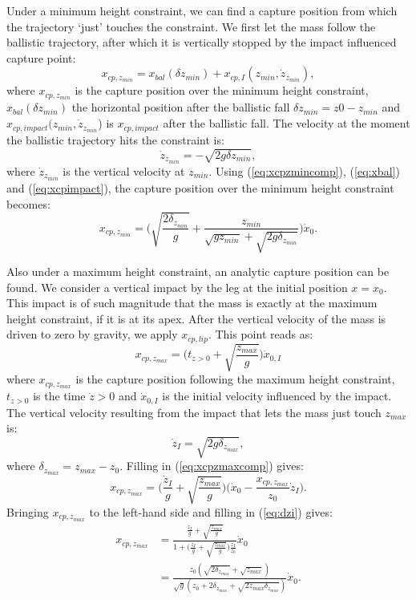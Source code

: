 \documentclass[letterpaper, 10 pt, conference]{ieeeconf}  %
\newcommand{\zmin}{z_{min}}
\newcommand{\zmax}{z_{max}}
\begin{document}
Under a minimum height constraint, we can find a capture position from which the trajectory `just' touches the constraint. We first let the mass follow the ballistic trajectory, after which it is vertically stopped by the impact influenced capture point:
\begin{equation}
	x_{cp,\zmin} = x_{bal}(\delta \zmin) + x_{cp,I}(\zmin, \dot{z}_{\zmin}),
	\label{eq:xcpzmincomp}
\end{equation}
where $x_{cp,\zmin}$ is the capture position over the minimum height constraint, $x_{bal}(\delta \zmin)$ the horizontal position after the ballistic fall $\delta \zmin = z0-\zmin$ and $x_{cp,impact}(\zmin,\dot{z}_{\zmin}$) is $x_{cp,impact}$ after the ballistic fall. The velocity at the moment the ballistic trajectory hits the constraint is:
\begin{equation}
	\dot{z}_{\zmin} = -\sqrt{2g\delta \zmin},
\end{equation}
where $\dot{z}_{\zmin}$ is the vertical velocity at $z_{min}$. Using (\ref{eq:xcpzmincomp}), (\ref{eq:xbal}) and (\ref{eq:xcpimpact}), the capture position over the minimum height constraint becomes:
\begin{equation}
	x_{cp,\zmin} = \Bigg(\sqrt{\frac{2\delta_{z_{min}}}{g}} + \frac{\zmin}{\sqrt{g \zmin}+\sqrt{2g\delta_{\zmin}}}\Bigg)\dot{x}_0.
\end{equation}

Also under a maximum height constraint, an analytic capture position can be found. We consider a vertical impact by the leg at the initial position $x=x_0$. This impact is of such magnitude that the mass is exactly at the maximum height constraint, if it is at its apex. After the vertical velocity of the mass is driven to zero by gravity, we apply $x_{cp,lip}$. This point reads as:
\begin{equation}
	x_{cp,\zmax} =\bigg(t_{\dot{z}>0} + \sqrt{\frac{\zmax}{g}}\bigg)\dot{x}_{0,I}
	\label{eq:xcpzmaxcomp}
\end{equation} 
where $x_{cp,\zmax}$ is the capture position following the maximum height constraint, $t_{\dot{z}>0}$ is the time $\dot{z}>0$ and $\dot{x}_{0,I}$ is the initial velocity influenced by the impact. The vertical velocity resulting from the impact that lets the mass just touch $\zmax$ is:
\begin{equation}
	\dot{z}_{I} = \sqrt{2g\delta_{\zmax}},
	\label{eq:dzi}
\end{equation}
where $\delta_{\zmax}=\zmax-z_0$. Filling in (\ref{eq:xcpzmaxcomp}) gives:
\begin{equation}
	x_{cp,\zmax} = \bigg(\frac{\dot{z}_I}{g}+\sqrt{\frac{\zmax}{g}}\bigg)\bigg(\dot{x}_0-\frac{x_{cp,\zmax}}{z_0}\dot{z}_I\bigg).
\end{equation}
Bringing $x_{cp,\zmax}$ to the left-hand side and filling in (\ref{eq:dzi}) gives:
\begin{align}
	x_{cp,\zmax}&=\frac{\frac{\dot{z}_I}{g}+\sqrt{\frac{z_{max}}{g}}}{1+\Big(\frac{\dot{z}_I}{g}+\sqrt{\frac{z_{max}}{g}}\Big)\frac{\dot{z}_I}{z_0}}\dot{x}_0\\
	&=\frac{z_0(\sqrt{2\delta_{\zmax}}+\sqrt{\zmax})}{\sqrt{g}(z_0 + 2\delta_{\zmax} + \sqrt{2\zmax \delta_{\zmax}})}\dot{x}_0.
\end{align}
\end{document}
